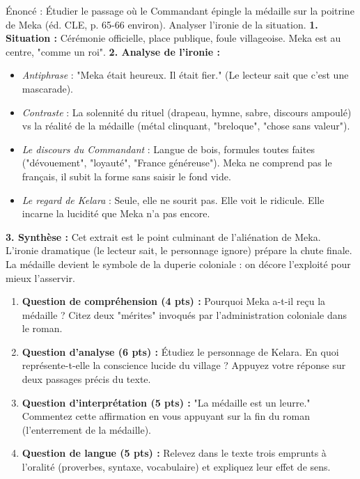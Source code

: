 \documentclass[11pt]{article}
\begin{document}
\begin{exoresolu}
Énoncé : Étudier le passage où le Commandant épingle la médaille sur la poitrine de Meka (éd. CLE, p. 65-66 environ). Analyser l'ironie de la situation.
\tcblower
\textbf{1. Situation :} Cérémonie officielle, place publique, foule villageoise. Meka est au centre, "comme un roi".
\textbf{2. Analyse de l'ironie :}
\begin{itemize}
\item \emph{Antiphrase} : "Meka était heureux. Il était fier." (Le lecteur sait que c'est une mascarade).
\item \emph{Contraste} : La solennité du rituel (drapeau, hymne, sabre, discours ampoulé) vs la réalité de la médaille (métal clinquant, "breloque", "chose sans valeur").
\item \emph{Le discours du Commandant} : Langue de bois, formules toutes faites ("dévouement", "loyauté", "France généreuse"). Meka ne comprend pas le français, il subit la forme sans saisir le fond vide.
\item \emph{Le regard de Kelara} : Seule, elle ne sourit pas. Elle voit le ridicule. Elle incarne la lucidité que Meka n'a pas encore.
\end{itemize}
\textbf{3. Synthèse :} Cet extrait est le point culminant de l'aliénation de Meka. L'ironie dramatique (le lecteur sait, le personnage ignore) prépare la chute finale. La médaille devient le symbole de la duperie coloniale : on décore l'exploité pour mieux l'asservir.
\end{exoresolu}

\begin{exercice}
\begin{enumerate}
\item \textbf{Question de compréhension (4 pts) :} Pourquoi Meka a-t-il reçu la médaille ? Citez deux "mérites" invoqués par l'administration coloniale dans le roman.
\item \textbf{Question d'analyse (6 pts) :} Étudiez le personnage de Kelara. En quoi représente-t-elle la conscience lucide du village ? Appuyez votre réponse sur deux passages précis du texte.
\item \textbf{Question d'interprétation (5 pts) :} "La médaille est un leurre." Commentez cette affirmation en vous appuyant sur la fin du roman (l'enterrement de la médaille).
\item \textbf{Question de langue (5 pts) :} Relevez dans le texte trois emprunts à l'oralité (proverbes, syntaxe, vocabulaire) et expliquez leur effet de sens.
\end{enumerate}
\end{exercice}
\end{document}
